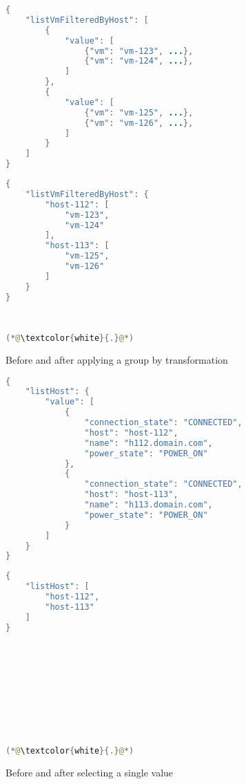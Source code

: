 \begin{figure}[h]
	\centering
	\begin{minipage}{.48\textwidth}
		\begin{lstlisting}[style=json,language=java]
{
	"listVmFilteredByHost": [
		{
			"value": [
				{"vm": "vm-123", ...},
				{"vm": "vm-124", ...},
			]
		},
		{
			"value": [
				{"vm": "vm-125", ...},
				{"vm": "vm-126", ...},
			]
		}
	]
}
		\end{lstlisting}
	\end{minipage}
	\hfill
	\begin{minipage}{.48\textwidth}
		\begin{lstlisting}[style=json,language=java]
{
	"listVmFilteredByHost": {
		"host-112": [
			"vm-123",
			"vm-124"
		],
		"host-113": [
			"vm-125",
			"vm-126"
		]
	}
}
	
	
	
(*@\textcolor{white}{.}@*)
		\end{lstlisting}
	\end{minipage}
	\caption{Before and after applying a group by transformation}
	\label{fig:delivery-platform--json-transformation-group-by}
\end{figure}

\begin{figure}[p]
	\centering
	\begin{minipage}{.58\textwidth}
		\begin{lstlisting}[style=json,language=java]
{
	"listHost": {
		"value": [
			{
				"connection_state": "CONNECTED",
				"host": "host-112",
				"name": "h112.domain.com",
				"power_state": "POWER_ON"
			},
			{
				"connection_state": "CONNECTED",
				"host": "host-113",
				"name": "h113.domain.com",
				"power_state": "POWER_ON"
			}
		]
	}
}
		\end{lstlisting}
	\end{minipage}
	\hfill
	\begin{minipage}{.4\textwidth}
		\begin{lstlisting}[style=json,language=java]
{
	"listHost": [
		"host-112",
		"host-113"
	]
}
			
			
			
			
			
			
			
			
			
			
			
(*@\textcolor{white}{.}@*)
		\end{lstlisting}
	\end{minipage}
	\caption{Before and after selecting a single value}
	\label{fig:delivery-platform--json-transformation-select}
\end{figure}

